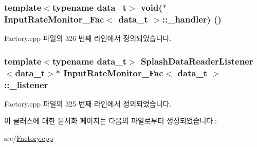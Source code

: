 \subsubsection[{\texorpdfstring{\+\_\+handler}{_handler}}]{\setlength{\rightskip}{0pt plus 5cm}template$<$typename data\+\_\+t$>$ void($\ast$ {\bf Input\+Rate\+Monitor\+\_\+\+Fac}$<$ data\+\_\+t $>$\+::\+\_\+handler) ()\hspace{0.3cm}{\ttfamily [private]}}\hypertarget{classInputRateMonitor__Fac_af4e49691b122c46ce77d50ed6f34c477}{}\label{classInputRateMonitor__Fac_af4e49691b122c46ce77d50ed6f34c477}


Factory.\+cpp 파일의 326 번째 라인에서 정의되었습니다.

\subsubsection[{\texorpdfstring{\+\_\+listener}{_listener}}]{\setlength{\rightskip}{0pt plus 5cm}template$<$typename data\+\_\+t$>$ {\bf Splash\+Data\+Reader\+Listener}$<$data\+\_\+t$>$$\ast$ {\bf Input\+Rate\+Monitor\+\_\+\+Fac}$<$ data\+\_\+t $>$\+::\+\_\+listener\hspace{0.3cm}{\ttfamily [private]}}\hypertarget{classInputRateMonitor__Fac_a9dd55c51ebb699228894bfae73ba61c7}{}\label{classInputRateMonitor__Fac_a9dd55c51ebb699228894bfae73ba61c7}


Factory.\+cpp 파일의 325 번째 라인에서 정의되었습니다.



이 클래스에 대한 문서화 페이지는 다음의 파일로부터 생성되었습니다.\+:\begin{DoxyCompactItemize}
\item 
src/\hyperlink{Factory_8cpp}{Factory.\+cpp}\end{DoxyCompactItemize}
